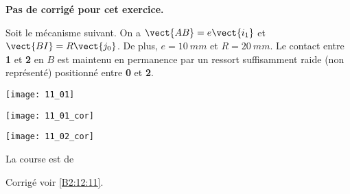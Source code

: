 \normalfalse \difficiletrue \tdifficilefalse
\correctiontrue


\setcounter{question}{0}
\ifcorrection
\else
\textbf{Pas de corrigé pour cet exercice.}
\fi

\ifprof
\else
Soit le mécanisme suivant. On a $\vect{AB}=e\vect{i_1}$ et $\vect{BI}=R\vect{j_0}$. De plus, 
$e=\SI{10}{mm}$ et $R=\SI{20}{mm}$. Le contact entre \textbf{1} et \textbf{2} en $B$ est maintenu en permanence par un ressort suffisamment raide (non représenté) positionné entre \textbf{0} et \textbf{2}. 
\begin{center}
\texttt{[image: 11\_01]}
\end{center}
\fi

\ifprof
\begin{center}
\texttt{[image: 11\_01\_cor]}
\end{center}
\else
\fi

\ifprof
\else
\fi

\ifprof
\else
\fi

\ifprof
\begin{center}
\texttt{[image: 11\_02\_cor]}
\end{center}
\else
\fi


\ifprof
La course est de 
\else
\fi



\ifprof
\else
\begin{flushright}
\footnotesize{Corrigé  voir \ref{B2:12:11}.}
\end{flushright}%
\fi